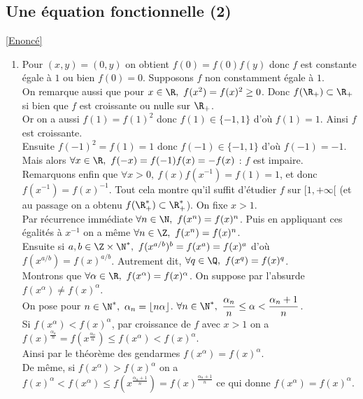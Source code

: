 \documentclass{book}
\begin{document}
	\subsection{Une équation fonctionnelle (2)}
	\label{Une équation fonctionnelle (2) corrigé}
	\textcolor{blue}{\hyperref[Une équation fonctionnelle (2)]{[Enoncé]}}\\
	\begin{enumerate}[leftmargin=*]
		\item Pour $(x,y)=(0,y)$ on obtient $f(0)=f(0)f(y)$ donc $f$ est constante égale à $1$ ou bien $f(0)=0$. Supposons $f$ non constamment égale à $1$.\\
		On remarque aussi que pour $x\in \R,\ f(x^2)=f(x)^2\geq 0$. Donc $f(\R_+)\subset \R_+$ si bien que $f$ est croissante ou nulle sur $\R_+$.\\
		Or on a aussi $f(1)=f(1)^2$ donc $f(1)\in \{-1,1\}$ d'où $f(1)=1$. Ainsi $f$ est croissante.\\
		Ensuite $f(-1)^2=f(1)=1$ donc $f(-1)\in \{-1,1\}$ d'où $f(-1)=-1$. Mais alors $\forall x\in \R,\ f(-x)=f(-1)f(x)=-f(x)$ : $f$ est impaire.\\
		Remarquons enfin que $\forall x>0,\ f(x)f(x^{-1})=f(1)=1$, et donc $f(x^{-1})=f(x)^{-1}$. Tout cela montre qu'il suffit d'étudier $f$ sur $[1,+\infty[$ (et au passage on a obtenu $f(\R^*_+)\subset \R^*_+$). On fixe $x>1$.\\
		Par récurrence immédiate $\forall n\in \N,\ f(x^n)=f(x)^n$. Puis en appliquant ces égalités à $x^{-1}$ on a même $\forall n\in \Z,\ f(x^n)=f(x)^n$.\\
		Ensuite si $a,b\in \Z\times \N^*,\ f(x^{a/b})^b=f(x^a)=f(x)^a$ d'où $f(x^{a/b})=f(x)^{a/b}$. Autrement dit, $\forall q\in \Q,\ f(x^q)=f(x)^q$.\\
		Montrons que $\forall \alpha\in \R,\ f(x^\alpha)=f(x)^\alpha$. On suppose par l'absurde $f(x^\alpha)\ne f(x)^\alpha$.\\
		On pose pour $n\in \N^*,\ \alpha_n=\lfloor n\alpha\rfloor$. $\forall n\in \N^*,\ \dfrac{\alpha_n}{n}\leq \alpha<\dfrac{\alpha_n+1}{n}$.\\
		Si $f(x^\alpha)<f(x)^\alpha$, par croissance de $f$ avec $x>1$ on a $f(x)^{\frac{\alpha_n}{n}}=f(x^{\frac{\alpha_n}{n}})\leq f(x^\alpha)<f(x)^\alpha$.\\
		Ainsi par le théorème des gendarmes $f(x^\alpha)=f(x)^\alpha$.\\
		De même, si $f(x^\alpha)>f(x)^\alpha$ on a $f(x)^\alpha<f(x^\alpha)\leq f(x^{\frac{\alpha_n+1}{n}})=f(x)^{\frac{\alpha_n+1}{n}}$ ce qui donne $f(x^\alpha)=f(x)^\alpha$.\\

\end{enumerate}
\end{document}
